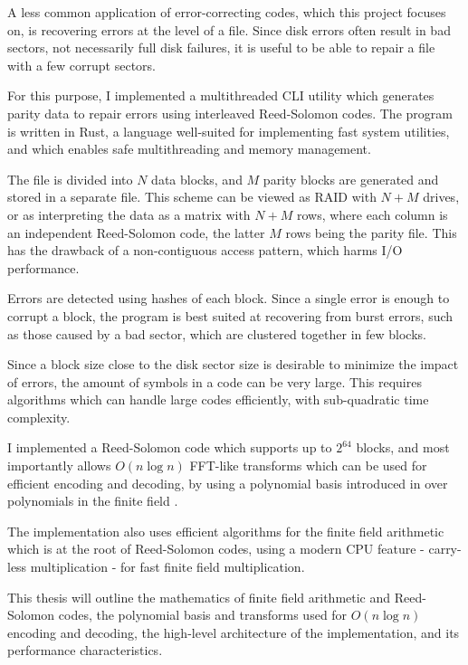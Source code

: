 A less common application of error-correcting codes, which this project focuses on, is recovering errors at the level of a file.
Since disk errors often result in bad sectors, not necessarily full disk failures, it is useful to be able to repair a file with a few corrupt sectors.

For this purpose, I implemented a multithreaded CLI utility which generates parity data to repair errors using interleaved Reed-Solomon codes.
The program is written in Rust, a language well-suited for implementing fast system utilities, and which enables safe multithreading and memory management.

The file is divided into $N$ data blocks, and $M$ parity blocks are generated and stored in a separate file.
This scheme can be viewed as RAID with $N + M$ drives, or as interpreting the data as a matrix with $N + M$ rows, where each column is an independent Reed-Solomon code, the latter $M$ rows being the parity file.
This has the drawback of a non-contiguous access pattern, which harms I/O performance.

Errors are detected using hashes of each block.
Since a single error is enough to corrupt a block, the program is best suited at recovering from burst errors, such as those caused by a bad sector, which are clustered together in few blocks.

Since a block size close to the disk sector size is desirable to minimize the impact of errors, the amount of symbols in a code can be very large.
This requires algorithms which can handle large codes efficiently, with sub-quadratic time complexity.

I implemented a Reed-Solomon code which supports up to $2^{64}$ blocks, and most importantly allows $O(n \log n)$ FFT-like transforms which can be used for efficient encoding and decoding,
by using a polynomial basis introduced in \cite{novel-poly} over polynomials in the finite field .

The implementation also uses efficient algorithms for the finite field arithmetic which is at the root of Reed-Solomon codes, using a modern CPU feature - carry-less multiplication \cite{intel-clmul} - for fast finite field multiplication.

This thesis will outline the mathematics of finite field arithmetic and Reed-Solomon codes, the polynomial basis and transforms used for $O(n \log n)$ encoding and decoding, the high-level architecture of the implementation, and its performance characteristics.
